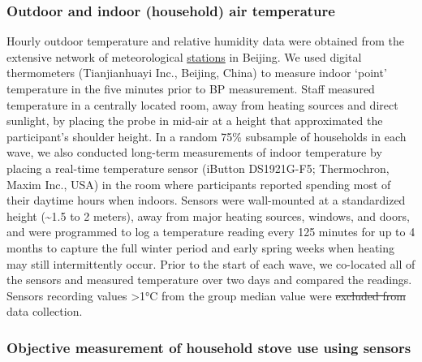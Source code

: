 \documentclass[
  letterpaper,
  DIV=11,
  numbers=noendperiod]{scrartcl}
\makeatletter
\providecommand{\DIFadd}[1]{{\protect\color{blue}\uwave{#1}}} %
\providecommand{\DIFdel}[1]{{\protect\color{red}\sout{#1}}} %
\providecommand{\DIFaddbegin}{} %
\providecommand{\DIFaddend}{} %
\providecommand{\DIFdelbegin}{} %
\providecommand{\DIFdelend}{} %
\newcommand{\DIFscaledelfig}{0.5}
\newlength{\DIFdelgraphicswidth} %
\newlength{\DIFdelgraphicsheight} %
\newcommand{\DIFaddincludegraphics}[2][]{{\color{blue}\fbox{\DIFOincludegraphics[#1]{#2}}}} %
\newcommand{\DIFdelincludegraphics}[2][]{%
\sbox{\DIFdelgraphicsbox}{\DIFOincludegraphics[#1]{#2}}%
\settoboxwidth{\DIFdelgraphicswidth}{\DIFdelgraphicsbox} %
\settoboxtotalheight{\DIFdelgraphicsheight}{\DIFdelgraphicsbox} %
\scalebox{\DIFscaledelfig}{%
\parbox[b]{\DIFdelgraphicswidth}{\usebox{\DIFdelgraphicsbox}\\[-\baselineskip] \rule{\DIFdelgraphicswidth}{0em}}\llap{\resizebox{\DIFdelgraphicswidth}{\DIFdelgraphicsheight}{%
\setlength{\unitlength}{\DIFdelgraphicswidth}%
\begin{picture}(1,1)%
\thicklines\linethickness{2pt} %
{\color[rgb]{1,0,0}\put(0,0){\framebox(1,1){}}}%
{\color[rgb]{1,0,0}\put(0,0){\line( 1,1){1}}}%
{\color[rgb]{1,0,0}\put(0,1){\line(1,-1){1}}}%
\end{picture}%
}\hspace*{3pt}}} %
} %
\DeclareRobustCommand{\DIFaddbegin}{\DIFOaddbegin \let\includegraphics\DIFaddincludegraphics} %
\DeclareRobustCommand{\DIFaddend}{\DIFOaddend \let\includegraphics\DIFOincludegraphics} %
\DeclareRobustCommand{\DIFdelbegin}{\DIFOdelbegin \let\includegraphics\DIFdelincludegraphics} %
\DeclareRobustCommand{\DIFdelend}{\DIFOaddend \let\includegraphics\DIFOincludegraphics} %
\let\sout@orig\sout %
\renewcommand{\sout}[1]{\ifmmode\text{\sout@orig{\ensuremath{#1}}}\else\sout@orig{#1}\fi} %
\makeatother
\begin{document}
\subsubsection{Outdoor and indoor (household) air
temperature}\label{outdoor-and-indoor-household-air-temperature}

Hourly outdoor temperature and relative humidity data were obtained from
the extensive network of meteorological
\href{http://beijingair.sinaapp.com}{stations} in Beijing. We used
digital thermometers (Tianjianhuayi Inc., Beijing, China) to measure
indoor `point' temperature in the five minutes prior to BP measurement.
Staff measured temperature in a centrally located room, away from
heating sources and direct sunlight, by placing the probe in mid-air at
a height that approximated the participant's shoulder height. In a
random 75\% subsample of households in each wave, we also conducted
long-term measurements of indoor temperature by placing a real-time
temperature sensor (iButton DS1921G-F5; Thermochron, Maxim Inc., USA) in
the room where participants reported spending most of their daytime
hours when indoors. Sensors were wall-mounted at a standardized height
(\textasciitilde1.5 to 2 meters), away from major heating sources,
windows, and doors, and were programmed to log a temperature reading
every 125 minutes for up to 4 months to capture the full winter period
and early spring weeks when heating may still intermittently occur.
Prior to the start of each wave, we co-located all of the sensors and
measured temperature over two days and compared the readings. Sensors
recording values \textgreater1°C from the group median value were \DIFdelbegin \DIFdel{excluded from }\DIFdelend \DIFaddbegin \DIFadd{not
deployed for }\DIFaddend data collection.

\subsubsection{Objective measurement of household stove use using
sensors}\label{objective-measurement-of-household-stove-use-using-sensors}
\end{document}
